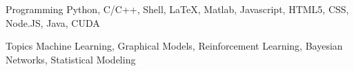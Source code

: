 


\begin{cvskills}


\cvskill
{Programming} %
{Python, C/C++, Shell, LaTeX, Matlab, Javascript, HTML5, CSS, Node.JS, Java, CUDA} %


\cvskill
{Topics} %
{Machine Learning, Graphical Models, Reinforcement Learning, Bayesian Networks, Statistical Modeling} %



\end{cvskills}